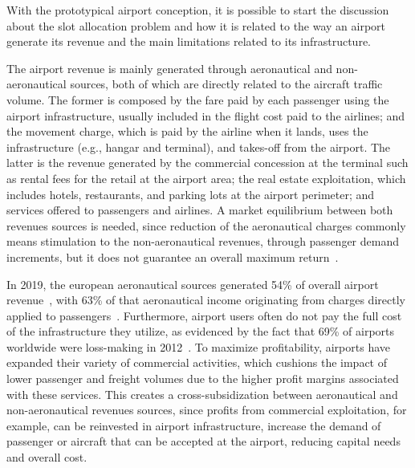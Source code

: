 With the prototypical airport conception, it is possible to start the discussion
about the slot allocation problem and how it is related to the way an airport
generate its revenue and the main limitations related to its infrastructure.



The airport revenue is mainly generated through aeronautical and
non-aeronautical sources, both of which are directly related to the aircraft
traffic volume.
%
The former is composed by the fare paid by each passenger using the airport
infrastructure, usually included in the flight cost paid to the airlines; and
the movement charge, which is paid by the airline when it lands, uses the
infrastructure (e.g., hangar and terminal), and takes-off from the airport.
%
The latter is the revenue generated by the commercial concession at the
terminal such as rental fees for the retail at the airport area; the real
estate exploitation, which includes hotels, restaurants, and parking lots at the
airport perimeter; and services offered to passengers and airlines.
%
A market equilibrium between both revenues sources is needed, since reduction
of the aeronautical charges commonly means stimulation to the non-aeronautical
revenues, through passenger demand increments, but it does not guarantee an
overall maximum return~\cite{ICAO2013}.



In 2019, the european aeronautical sources generated 54\% of overall airport
revenue~\cite{ACI2021}, with 63\% of that aeronautical income originating from
charges directly applied to passengers~\cite{ICAO2013}.
%
Furthermore, airport users often do not pay the full cost of the infrastructure
they utilize, as evidenced by the fact that 69\% of airports worldwide were
loss-making in 2012~\cite{ACI2021}.
%
To maximize profitability, airports have expanded their variety of commercial
activities, which cushions the impact of lower passenger and freight volumes due
to the higher profit margins associated with these services.
%
This creates a cross-subsidization between aeronautical and non-aeronautical
revenues sources, since profits from commercial exploitation, for example, can
be reinvested in airport infrastructure, increase the demand of passenger or
aircraft that can be accepted at the airport, reducing capital needs and overall
cost.




